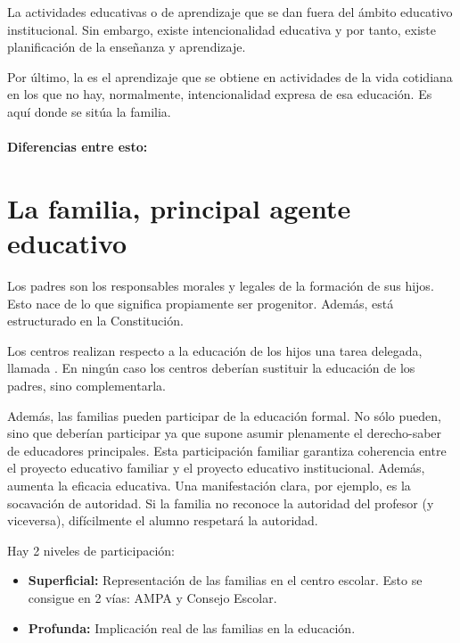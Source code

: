 \documentclass[palatino]{apuntesURJC}
\begin{document}
La  actividades educativas o de aprendizaje que se dan fuera del ámbito educativo institucional. 
%
Sin embargo, existe intencionalidad educativa y por tanto, existe planificación de la enseñanza y aprendizaje.

Por último, la  es el aprendizaje que se obtiene en actividades de la vida cotidiana en los que no hay, normalmente, intencionalidad expresa de esa educación.
%
Es aquí donde se sitúa la familia.

\paragraph{Diferencias entre esto:}


\section{La familia, principal agente educativo}

Los padres son los responsables morales y legales de la formación de sus hijos. 
%
Esto nace de lo que significa propiamente ser progenitor.
%
Además, está estructurado en la Constitución.

Los centros realizan respecto a la educación de los hijos una tarea delegada, llamada .
%
En ningún caso los centros deberían sustituir la educación de los padres, sino complementarla.

Además, las familias pueden participar de la educación formal. 
%
No sólo pueden, sino que deberían participar ya que supone asumir plenamente el derecho-saber de educadores principales.
%
Esta participación familiar garantiza coherencia entre el proyecto educativo familiar y el proyecto educativo institucional. 
%
Además, aumenta la eficacia educativa.
%
Una manifestación clara, por ejemplo, es la socavación de autoridad. 
%
Si la familia no reconoce la autoridad del profesor (y viceversa), difícilmente el alumno respetará la autoridad.

Hay 2 niveles de participación:
\begin{itemize}
	\item \textbf{Superficial:} Representación de las familias en el centro escolar. 
	Esto se consigue en 2 vías: AMPA y Consejo Escolar.
	\item \textbf{Profunda:} Implicación real de las familias en la educación.
\end{itemize}
\end{document}
